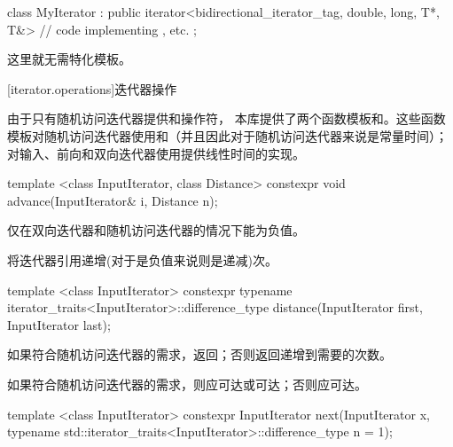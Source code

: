 \begin{codeblock}
class MyIterator :
  public iterator<bidirectional_iterator_tag, double, long, T*, T&> {
  // code implementing \tcode{++}, etc.
};
\end{codeblock}

\pnum
这里就无需特化模板。
\exitexample

[iterator.operations]{迭代器操作}

\pnum
由于只有随机访问迭代器提供\tcode{+}和\tcode{-}操作符， 本库提供了两个函数模板和。这些函数模板对随机访问迭代器使用\tcode{+}和\tcode{-}（并且因此对于随机访问迭代器来说是常量时间）；对输入、前向和双向迭代器使用\tcode{++}提供线性时间的实现。

%
\begin{itemdecl}
template <class InputIterator, class Distance>
  constexpr void advance(InputIterator& i, Distance n);
\end{itemdecl}

\begin{itemdescr}
\pnum
\requires
{}仅在双向迭代器和随机访问迭代器的情况下能为负值。

\pnum
\effects
将迭代器引用递增(对于是负值来说则是递减)次。
\end{itemdescr}

%
\begin{itemdecl}
template <class InputIterator>
  constexpr typename iterator_traits<InputIterator>::difference_type
    distance(InputIterator first, InputIterator last);
\end{itemdecl}

\begin{itemdescr}
\pnum
\effects
如果符合随机访问迭代器的需求，返回；否则返回递增到需要的次数。

\pnum
\requires
如果符合随机访问迭代器的需求，则应可达或可达；否则应可达。
\end{itemdescr}

%
\begin{itemdecl}
template <class InputIterator>
  constexpr InputIterator next(InputIterator x,
    typename std::iterator_traits<InputIterator>::difference_type n = 1);
\end{itemdecl}

